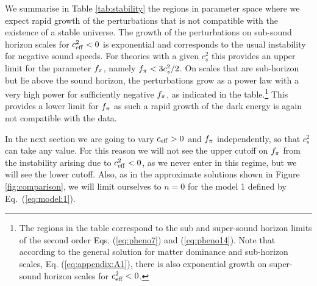 We summarise in Table \ref{tab:stability} the regions in parameter space where we expect rapid growth of the perturbations
that is not compatible with the existence of a stable universe. The growth of the perturbations on sub-sound horizon scales for $c_{\rm eff}^2<0$
is exponential and corresponds to the usual instability for negative sound speeds. For theories with a given $c_s^2$ this provides an
upper limit for the parameter $f_\pi$, namely $f_\pi < 3 c_s^2 /2$. On scales that are sub-horizon but lie above the sound horizon,
the perturbations grow as a power law with a very high power for sufficiently negative $f_\pi$, as indicated in the table.\footnote{The regions in the table correspond to the sub and super-sound horizon limits of the second order Eqs. (\ref{eq:pheno7}) and (\ref{eq:pheno14}). Note that according to the general solution for matter dominance and sub-horizon scales, Eq. (\ref{eq:appendix:A1}),  there is also exponential growth on super-sound horizon scales for $ c_{\rm eff}^2<0 $.} This provides
a lower limit for $f_\pi$ as such a rapid growth of the dark energy is again not compatible with the data.

In the next section we are going to vary $c_{\rm eff}>0$ and $f_\pi$ independently, so that $c_s^2$ can take any value. For this reason we
will not see the upper cutoff on $f_\pi$ from the instability arising due to $c_{\rm eff}^2<0$, as we never enter in this regime, but we will
see the lower cutoff. Also, as in the approximate solutions shown in Figure \ref{fig:comparison}, we will limit ourselves to $n=0$ for
the model 1 defined by Eq.\ (\ref{eq:model:1}).

